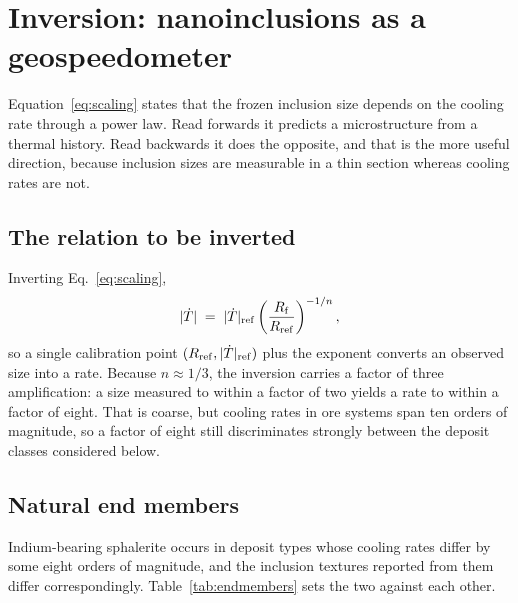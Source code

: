 \documentclass[11pt,a4paper]{article}
\begin{document}
\section{Inversion: nanoinclusions as a geospeedometer}
\label{sec:geospeedometer}

Equation~\eqref{eq:scaling} states that the frozen inclusion size depends on the
cooling rate through a power law. Read forwards it predicts a microstructure
from a thermal history. Read backwards it does the opposite, and that is the
more useful direction, because inclusion sizes are measurable in a thin section
whereas cooling rates are not.

\subsection{The relation to be inverted}

Inverting Eq.~\eqref{eq:scaling},
\begin{equation}
\lvert \dot{T} \rvert \;=\; \lvert \dot{T} \rvert_{\rm ref}
      \left( \frac{R_{\rm f}}{R_{\rm ref}} \right)^{-1/n},
\label{eq:invert}
\end{equation}
so a single calibration point $(R_{\rm ref}, |\dot{T}|_{\rm ref})$ plus the
exponent converts an observed size into a rate. Because $n \approx 1/3$, the
inversion carries a factor of three amplification: a size measured to within a
factor of two yields a rate to within a factor of eight. That is coarse, but
cooling rates in ore systems span ten orders of magnitude, so a factor of eight
still discriminates strongly between the deposit classes considered below.

\subsection{Natural end members}

Indium-bearing sphalerite occurs in deposit types whose cooling rates differ by
some eight orders of magnitude, and the inclusion textures reported from them
differ correspondingly. Table~\ref{tab:endmembers} sets the two against each
other.
\end{document}
